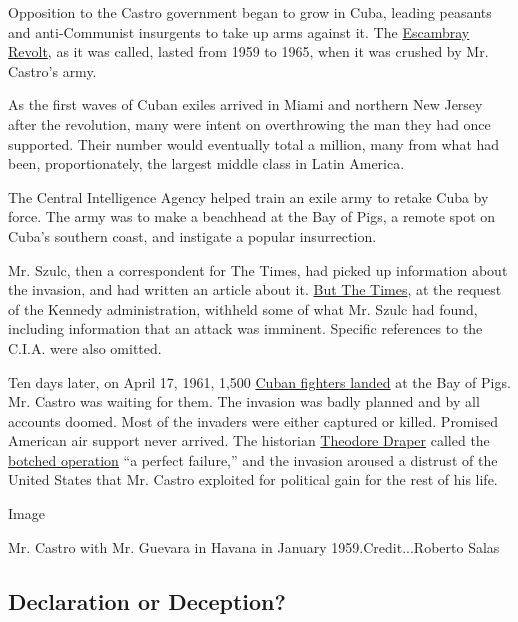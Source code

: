 Opposition to the Castro government began to grow in Cuba, leading
peasants and anti-Communist insurgents to take up arms against it. The
\href{http://www.nytimes3xbfgragh.onion/1964/05/21/exiles-proclaim-anticastro-war-and-urge-revolt.html}{Escambray
Revolt}, as it was called, lasted from 1959 to 1965, when it was crushed
by Mr. Castro's army.

As the first waves of Cuban exiles arrived in Miami and northern New
Jersey after the revolution, many were intent on overthrowing the man
they had once supported. Their number would eventually total a million,
many from what had been, proportionately, the largest middle class in
Latin America.

The Central Intelligence Agency helped train an exile army to retake
Cuba by force. The army was to make a beachhead at the Bay of Pigs, a
remote spot on Cuba's southern coast, and instigate a popular
insurrection.

Mr. Szulc, then a correspondent for The Times, had picked up information
about the invasion, and had written an article about it.
\href{http://www.nytimes3xbfgragh.onion/times-insider/2014/12/26/1961-the-c-i-a-readies-a-cuban-invasion-and-the-times-blinks/}{But
The Times}, at the request of the Kennedy administration, withheld some
of what Mr. Szulc had found, including information that an attack was
imminent. Specific references to the C.I.A. were also omitted.

Ten days later, on April 17, 1961, 1,500
\href{http://query.nytimes3xbfgragh.onion/gst/abstract.html?res=9406E6D7133DE733A2575BC1A9629C946091D6CF}{Cuban
fighters landed} at the Bay of Pigs. Mr. Castro was waiting for them.
The invasion was badly planned and by all accounts doomed. Most of the
invaders were either captured or killed. Promised American air support
never arrived. The historian
\href{http://www.nytimes3xbfgragh.onion/2006/02/22/national/22DRAPER.html}{Theodore
Draper} called the
\href{http://www.nytimes3xbfgragh.onion/2001/03/23/world/bay-of-pigs-enemies-finally-sit-down-together.html}{botched
operation} ``a perfect failure,'' and the invasion aroused a distrust of
the United States that Mr. Castro exploited for political gain for the
rest of his life.

Image

Mr. Castro with Mr. Guevara in Havana in January 1959.Credit...Roberto
Salas

\hypertarget{declaration-or-deception}{%
\subsection{Declaration or Deception?}\label{declaration-or-deception}}

